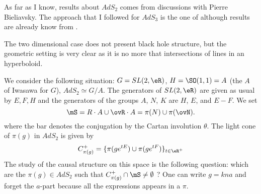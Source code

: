  As far as I know, results about $AdS_2$ comes from discussions with Pierre Bieliavsky. The approach that I followed for $AdS_3$ is the one of \cite{BTZB_un,BTZB_deux} although results are already know from \cite{BTZ_un,BTZ_deux}.

The two dimensional case does not present black hole structure, but the geometric setting is very clear as it is no more that intersections of lines in an hyperboloid.

We consider the following situation: $G=SL(2,\eR)$, $H=\SO(1,1)=A$ (the $A$ of Iwasawa for $G$), $AdS_2\simeq G/A$. The generators of $SL(2,\eR)$ are given as usual by $E,F,H$ and the generators of the groups $A$, $N$, $K$ are $H$, $E$, and $E-F$. We set
\[
\mS=R\cdot A\cup \ovR\cdot A=\pi(N)\cup\pi(\ovN).
\]
where the bar denotes the conjugation by the Cartan involution $\theta$. The light cone of $\pi(g)$ in $AdS_2$ is given by
\begin{equation}
C^+_{\pi(g)}=\{ \pi(ge^{tE})\cup\pi(ge^{tF}) \}_{t\in\eR^+}
\end{equation}
The study of the causal structure on this space is the following question: which are the $\pi(g)\in AdS_2$ such that $C^+_{\pi(g)}\cap\mS\neq \emptyset$ ? One can write $g=kna$ and forget the $a$-part because all the expressions appears in a $\pi$.

